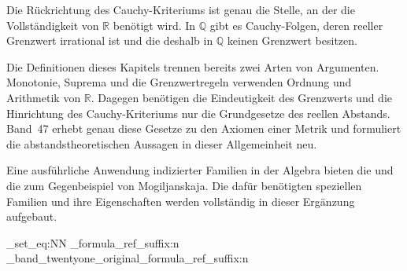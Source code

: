 \documentclass[main.tex]{subfiles}
\begin{document}
\begin{tabproofsplitwide}
  \closeproofpartwide
\end{tabproofsplitwide}

Die Rückrichtung des Cauchy-Kriteriums ist genau die Stelle, an der die
Vollständigkeit von \(\mathbb R\) benötigt wird. In \(\mathbb Q\) gibt es
Cauchy-Folgen, deren reeller Grenzwert irrational ist und die deshalb in
\(\mathbb Q\) keinen Grenzwert besitzen.

Die Definitionen dieses Kapitels trennen bereits zwei Arten von Argumenten.
Monotonie, Suprema und die Grenzwertregeln verwenden Ordnung und Arithmetik
von \(\mathbb R\). Dagegen benötigen die Eindeutigkeit des Grenzwerts und die
Hinrichtung des Cauchy-Kriteriums nur die Grundgesetze des reellen Abstands.
Band~47 erhebt genau diese Gesetze zu den Axiomen einer Metrik und formuliert
die abstandstheoretischen Aussagen in dieser Allgemeinheit neu.

Eine ausführliche Anwendung indizierter Familien in der Algebra bieten
die \MogReadingLink{} und die \MogProofsLink{} zum Gegenbeispiel von
Mogiljanskaja. Die dafür benötigten speziellen Familien und ihre
Eigenschaften werden vollständig in dieser Ergänzung aufgebaut.

\let\RuleRefWithArg\BandTwentyOneOriginalRuleRefWithArg
\ExplSyntaxOn
\cs_set_eq:NN
  \mx_formula_ref_suffix:n
  \mx_band_twentyone_original_formula_ref_suffix:n
\ExplSyntaxOff
\end{document}
